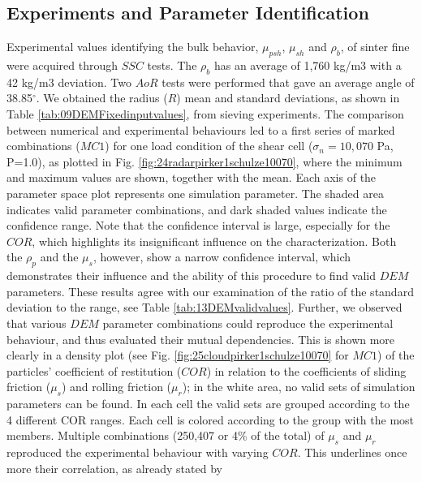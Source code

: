 \documentclass{CFD2015}
\begin{document}

\subsection{Experiments and Parameter Identification}
\label{subsec:experimentsparameteridentification}

Experimental values identifying the bulk behavior, $\mu_{psh}$, $\mu_{sh}$ and $\rho_{b}$, 
of sinter fine were acquired through $SSC$ tests. 
The $\rho_b$ has an average of 1,760 kg/m3 with a 42 
kg/m3 deviation.
Two $AoR$ tests were performed that gave an average angle of
38.85$^\circ$.
We obtained the radius ($R$) mean and standard
deviations, as shown in Table
\ref{tab:09DEMFixedinputvalues}, from sieving experiments.
The comparison between numerical and experimental behaviours led to a first
series of marked combinations ($MC1$) for one load condition of
the shear cell ($\sigma_n=10,070$ Pa, P=1.0), as plotted in Fig.
\ref{fig:24radarpirker1schulze10070}, where 
the minimum and maximum values are shown, together with the mean. 
Each axis of the parameter space plot represents one simulation parameter.
The shaded area indicates valid parameter combinations, and dark shaded
values indicate the confidence range.
Note that the confidence interval is large, 
especially for the $COR$, which highlights its insignificant influence on the
characterization.
Both the $\rho_p$  and the $\mu_s$, however, show a narrow confidence interval, 
which demonstrates their influence and the ability of this procedure to find
valid $DEM$ parameters.
These results agree with our examination of the ratio of the standard deviation
to the range, see Table \ref{tab:13DEMvalidvalues}.
Further, we observed that various $DEM$ parameter
combinations could reproduce the experimental behaviour, and thus evaluated
their mutual dependencies.
This is shown more clearly in a density plot (see Fig. 
\ref{fig:25cloudpirker1schulze10070} for $MC1$) 
of the particles' coefficient of restitution ($COR$) in relation to
the coefficients of sliding friction ($\mu_s$) and rolling friction ($\mu_r$); 
in the white area, no valid sets of simulation parameters can be found.
In each cell the valid sets are grouped according to the 4 different COR
ranges.
Each cell is colored according to the group with the most members.
Multiple
combinations (250,407 or 4\% of the total) of $\mu_s$ and $\mu_r$ reproduced
the experimental behaviour with varying $COR$.
This underlines once more their correlation, as already stated by
\end{document}
